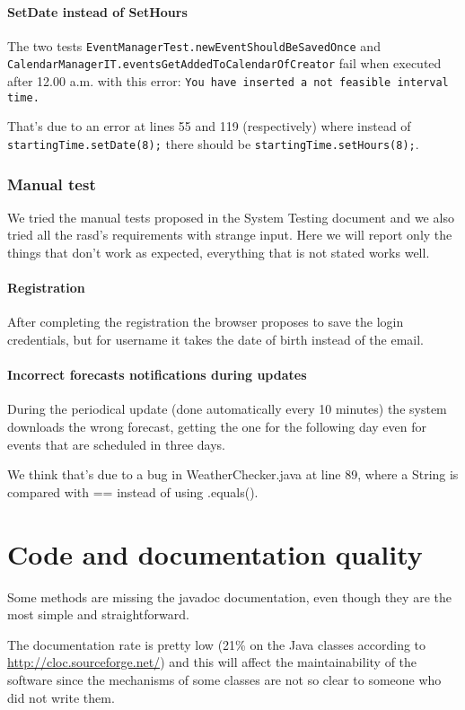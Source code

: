 \documentclass[10pt,a4paper,titlepage]{article}
\begin{document}
\subsection{SetDate instead of SetHours}
The two tests \texttt{EventManagerTest.newEventShouldBeSavedOnce} and\\ \texttt{CalendarManagerIT.eventsGetAddedToCalendarOfCreator} fail when executed after 12.00 a.m. with this error: \texttt{You have inserted a not feasible interval time.}

That's due to an error at lines 55 and 119 (respectively) where instead of \texttt{startingTime.setDate(8);} there should be \texttt{startingTime.setHours(8);}.

\section{Manual test}
We tried the manual tests proposed in the System Testing document and we also tried all the rasd's requirements with strange input. Here we will report only the things that don't work as expected, everything that is not stated works well.

\subsection{Registration}
After completing the registration the browser proposes to save the login credentials, but for username it takes the date of birth instead of the email.

\subsection{Incorrect forecasts notifications during updates}
During the periodical update (done automatically every 10 minutes) the system downloads the wrong forecast, getting the one for the following day even for events that are scheduled in three days.

We think that's due to a bug in WeatherChecker.java at line 89, where a String is compared with == instead of using .equals().

\pagebreak
\part{Code and documentation quality}
\label{part4}
Some methods are missing the javadoc documentation, even though they are the most simple and straightforward.

The documentation rate is pretty low (21\% on the Java classes according to \url{http://cloc.sourceforge.net/}) and this will affect the maintainability of the software since the mechanisms of some classes are not so clear to someone who did not write them.
\end{document}
